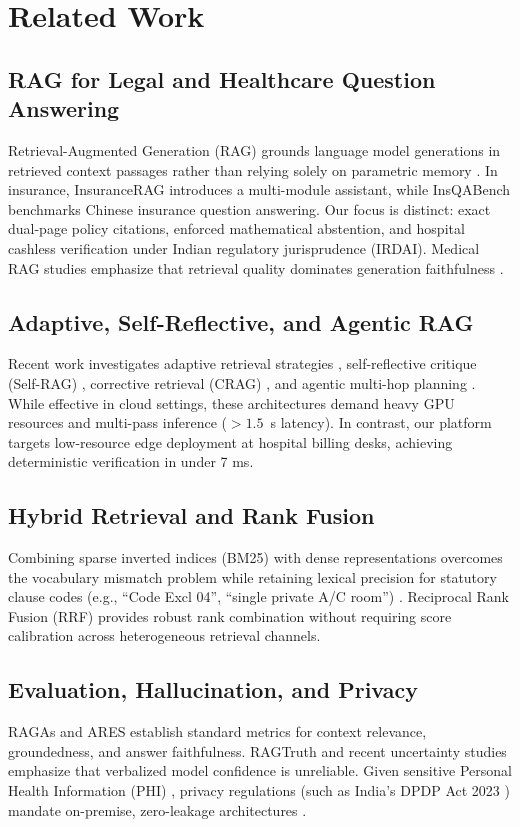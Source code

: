 \documentclass[conference]{IEEEtran}
\begin{document}
\section{Related Work}
\subsection{RAG for Legal and Healthcare Question Answering}
Retrieval-Augmented Generation (RAG) grounds language model generations in retrieved context passages rather than relying solely on parametric memory \cite{lewis2020rag}. In insurance, InsuranceRAG \cite{hanmante2026insurancerag} introduces a multi-module assistant, while InsQABench \cite{wei2026insqabench} benchmarks Chinese insurance question answering. Our focus is distinct: exact dual-page policy citations, enforced mathematical abstention, and hospital cashless verification under Indian regulatory jurisprudence (IRDAI). Medical RAG studies emphasize that retrieval quality dominates generation faithfulness \cite{amugongo2025retrieval,miao2025improving,fensore2025does,xiong2024benchmarking}.

\subsection{Adaptive, Self-Reflective, and Agentic RAG}
Recent work investigates adaptive retrieval strategies \cite{jeong2024adaptiverag}, self-reflective critique (Self-RAG) \cite{asai2024selfrag}, corrective retrieval (CRAG) \cite{yan2024crag}, and agentic multi-hop planning \cite{singh2025agentic}. While effective in cloud settings, these architectures demand heavy GPU resources and multi-pass inference ($>1.5$~s latency). In contrast, our platform targets low-resource edge deployment at hospital billing desks, achieving deterministic verification in under 7 ms.

\subsection{Hybrid Retrieval and Rank Fusion}
Combining sparse inverted indices (BM25) with dense representations overcomes the vocabulary mismatch problem while retaining lexical precision for statutory clause codes (e.g., ``Code Excl 04'', ``single private A/C room'') \cite{xiong2024benchmarking}. Reciprocal Rank Fusion (RRF) \cite{cormack2009rrf} provides robust rank combination without requiring score calibration across heterogeneous retrieval channels.

\subsection{Evaluation, Hallucination, and Privacy}
RAGAs \cite{es2024ragas} and ARES \cite{saadfalcon2024ares} establish standard metrics for context relevance, groundedness, and answer faithfulness. RAGTruth \cite{niu2024ragtruth} and recent uncertainty studies \cite{yona2024uncertainty} emphasize that verbalized model confidence is unreliable. Given sensitive Personal Health Information (PHI) \cite{zhong2025privacy}, privacy regulations (such as India's DPDP Act 2023 \cite{dpdp2023}) mandate on-premise, zero-leakage architectures \cite{chakraborty2025federated,he2025mitigating}.
\end{document}
